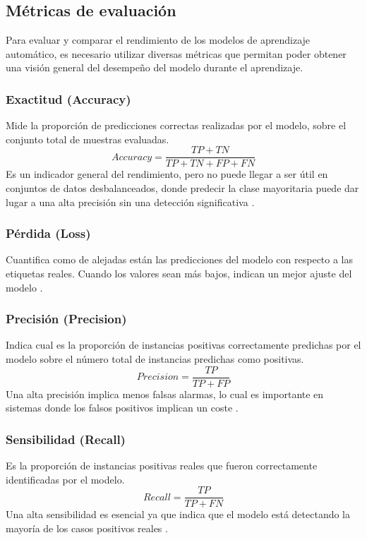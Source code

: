 \subsection{Métricas de evaluación}
\label{subsec:Evaluacion}
Para evaluar y comparar el rendimiento de los modelos de aprendizaje automático, es necesario utilizar diversas métricas que permitan poder obtener una visión general del desempeño del modelo durante el aprendizaje.

\subsubsection{Exactitud (Accuracy)}
\label{subsubsec:Accuracy}
Mide la proporción de predicciones correctas realizadas por el modelo, sobre el conjunto total de muestras evaluadas.
\[Accuracy = \frac{TP + TN}{TP + TN + FP + FN}\]
Es un indicador general del rendimiento, pero no puede llegar a ser útil en conjuntos de datos desbalanceados, donde predecir la clase mayoritaria puede dar lugar a una alta precisión sin una detección significativa \cite{metricas}.

\subsubsection{Pérdida (Loss)}
\label{subsubsec:Loss}
Cuantifica como de alejadas están las predicciones del modelo con respecto a las etiquetas reales. Cuando los valores sean más bajos, indican un mejor ajuste del modelo \cite{perdida}.

\subsubsection{Precisión (Precision)}
\label{subsubsec:Precision}
Indica cual es la proporción de instancias positivas correctamente predichas por el modelo sobre el número total de instancias predichas como positivas.
\[Precision = \frac{TP}{TP + FP}\]
Una alta precisión implica menos falsas alarmas, lo cual es importante en sistemas donde los falsos positivos implican un coste \cite{metricas}.

\subsubsection{Sensibilidad (Recall)}
\label{subsubsec:Recall}
Es la proporción de instancias positivas reales que fueron correctamente identificadas por el modelo.
\[Recall = \frac{TP}{TP + FN}\] 
Una alta sensibilidad es esencial ya que indica que el modelo está detectando la mayoría de los casos positivos reales \cite{metricas}.

